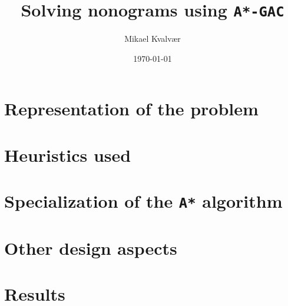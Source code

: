 \documentclass[notitlepage, 10pt, twocolumn]{report} %
\title{Solving nonograms using \texttt{A*-GAC}}
\author{Mikael Kvalvær}
\date{\today}
\begin{document}
\maketitle

\section{Representation of the problem}
  

\section{Heuristics used}
  

\section{Specialization of the \texttt{A*} algorithm}
  

\section{Other design aspects}
  

\section{Results}
  
\end{document}
